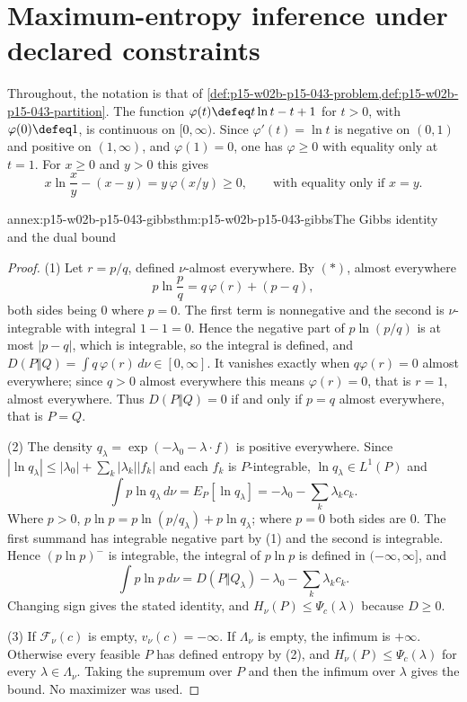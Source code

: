 \section{Maximum-entropy inference under declared constraints}
\label{sec:annex-p15-w02b-p15-043-maxent}

Throughout, the notation is that of
\cref{def:p15-w02b-p15-043-problem,def:p15-w02b-p15-043-partition}.
The function \(\varphi(t)\defeq t\ln t-t+1\) for \(t>0\), with
\(\varphi(0)\defeq1\), is continuous on \([0,\infty)\). Since
\(\varphi'(t)=\ln t\) is negative on \((0,1)\) and positive on
\((1,\infty)\), and \(\varphi(1)=0\), one has \(\varphi\geq0\) with
equality only at \(t=1\). For \(x\geq0\) and \(y>0\) this gives
\begin{equation*}
 x\ln\frac xy-(x-y)=y\,\varphi(x/y)\geq0,
 \qquad\text{with equality only if }x=y. \tag{\(\ast\)}
\end{equation*}

\begin{annexitem}{annex:p15-w02b-p15-043-gibbs}{thm:p15-w02b-p15-043-gibbs}{The Gibbs identity and the dual bound}
\begin{proof}
(1) Let \(r=p/q\), defined \(\nu\)-almost everywhere. By \((\ast)\), almost
everywhere
\[
 p\ln\frac pq=q\,\varphi(r)+(p-q),
\]
both sides being \(0\) where \(p=0\). The first term is nonnegative and the
second is \(\nu\)-integrable with integral \(1-1=0\). Hence the negative part
of \(p\ln(p/q)\) is at most \(|p-q|\), which is integrable, so the integral is
defined, and
\(D(P\Vert Q)=\int q\,\varphi(r)\,d\nu\in[0,\infty]\). It vanishes exactly
when \(q\varphi(r)=0\) almost everywhere; since \(q>0\) almost everywhere this
means \(\varphi(r)=0\), that is \(r=1\), almost everywhere. Thus
\(D(P\Vert Q)=0\) if and only if \(p=q\) almost everywhere, that is \(P=Q\).

(2) The density \(q_\lambda=\exp(-\lambda_0-\lambda\cdot f)\) is positive
everywhere. Since \(|\ln q_\lambda|\leq|\lambda_0|+\sum_k|\lambda_k||f_k|\)
and each \(f_k\) is \(P\)-integrable, \(\ln q_\lambda\in L^1(P)\) and
\[
 \int p\ln q_\lambda\,d\nu=E_P[\ln q_\lambda]=-\lambda_0-\sum_k\lambda_kc_k .
\]
Where \(p>0\), \(p\ln p=p\ln(p/q_\lambda)+p\ln q_\lambda\); where \(p=0\)
both sides are \(0\). The first summand has integrable negative part by (1)
and the second is integrable. Hence \((p\ln p)^-\) is integrable, the integral
of \(p\ln p\) is defined in \((-\infty,\infty]\), and
\[
 \int p\ln p\,d\nu=D(P\Vert Q_\lambda)-\lambda_0-\sum_k\lambda_kc_k .
\]
Changing sign gives the stated identity, and \(H_\nu(P)\leq\Psi_c(\lambda)\)
because \(D\geq0\).

(3) If \(\mathcal F_\nu(c)\) is empty, \(v_\nu(c)=-\infty\). If
\(\Lambda_\nu\) is empty, the infimum is \(+\infty\). Otherwise every feasible
\(P\) has defined entropy by (2), and \(H_\nu(P)\leq\Psi_c(\lambda)\) for
every \(\lambda\in\Lambda_\nu\). Taking the supremum over \(P\) and then the
infimum over \(\lambda\) gives the bound. No maximizer was used.
\end{proof}
\end{annexitem}

